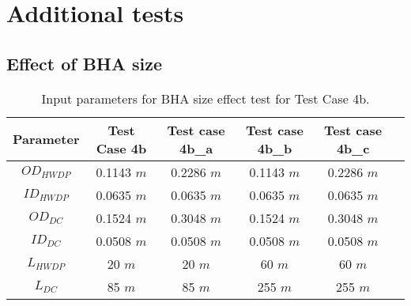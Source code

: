 \chapter{Additional tests}
\section{Effect of BHA size}
%
\begin{table}
    \centering
    \begin{tabular}{|c|c|c|c|c|c|}
       \hline 
       \textbf{Parameter} & \textbf{Test Case 4b} & \textbf{Test case 4b\_a} & \textbf{Test case 4b\_b} & \textbf{Test case 4b\_c}\\
       \hline
       $OD_{HWDP}$ & 0.1143 $m$ & 0.2286 $m$ & 0.1143 $m$ & 0.2286 $m$ \\
       \hline
       $ID_{HWDP}$ & 0.0635 $m$ & 0.0635 $m$ & 0.0635 $m$ & 0.0635 $m$ \\
       \hline
       $OD_{DC}$ & 0.1524 $m$ & 0.3048 $m$ & 0.1524 $m$ & 0.3048 $m$ \\
       \hline
       $ID_{DC}$ & 0.0508 $m$ & 0.0508 $m$ & 0.0508 $m$ & 0.0508 $m$ \\                                                    
       \hline
       $L_{HWDP}$ & 20 $m$ & 20 $m$ & 60 $m$ & 60 $m$ \\
       \hline
       $L_{DC}$ & 85 $m$ & 85 $m$ & 255 $m$ & 255 $m$ \\
       \hline
      \end{tabular}
    \caption[Input parameters for BHA size effect test for Test Case 4b]{Input parameters for BHA size effect test for Test Case 4b.}
    \label{table_sensitivity_size_4b_input}
\end{table} 

